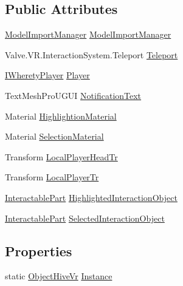 \subsection*{Public Attributes}
\begin{DoxyCompactItemize}
\item 
\mbox{\hyperlink{class_model_import_manager}{Model\+Import\+Manager}} \mbox{\hyperlink{class_object_hive_vr_a5d86649a9b24ee1b196f9c2aa413cbfd}{Model\+Import\+Manager}}
\item 
Valve.\+V\+R.\+Interaction\+System.\+Teleport \mbox{\hyperlink{class_object_hive_vr_add58fc9fdf79c5cfab3cfad8124c2ce7}{Teleport}}
\item 
\mbox{\hyperlink{interface_i_wherety_player}{I\+Wherety\+Player}} \mbox{\hyperlink{class_object_hive_vr_aed7cdec7b161cf6ecced26e603507571}{Player}}
\item 
Text\+Mesh\+Pro\+U\+G\+UI \mbox{\hyperlink{class_object_hive_vr_a4d84ab09a06a5365c4fff5f17c9fa2f5}{Notification\+Text}}
\item 
Material \mbox{\hyperlink{class_object_hive_vr_a2f65eda8022673c0c981ed7f48d93594}{Highlightion\+Material}}
\item 
Material \mbox{\hyperlink{class_object_hive_vr_aced5b60257918a2f678389425e0a719f}{Selection\+Material}}
\item 
Transform \mbox{\hyperlink{class_object_hive_vr_a0cf0a7285ce568891bcabe852acb0e87}{Local\+Player\+Head\+Tr}}
\item 
Transform \mbox{\hyperlink{class_object_hive_vr_aa00f4426f67a08ebb7ae7a46b122d7f1}{Local\+Player\+Tr}}
\item 
\mbox{\hyperlink{class_interactable_part}{Interactable\+Part}} \mbox{\hyperlink{class_object_hive_vr_ae93ae57750302e7923144b1ae10d3864}{Highlighted\+Interaction\+Object}}
\item 
\mbox{\hyperlink{class_interactable_part}{Interactable\+Part}} \mbox{\hyperlink{class_object_hive_vr_a746c51547433c72880a8f1aca7d4da3d}{Selected\+Interaction\+Object}}
\end{DoxyCompactItemize}
\subsection*{Properties}
\begin{DoxyCompactItemize}
\item 
static \mbox{\hyperlink{class_object_hive_vr}{Object\+Hive\+Vr}} \mbox{\hyperlink{class_object_hive_vr_a536da3e66f9e9f1ddc9f88a8957ff7eb}{Instance}}
\end{DoxyCompactItemize}


